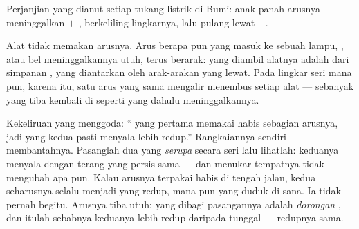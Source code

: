 \begin{omfigure}

{\small Perjanjian yang dianut setiap tukang listrik di Bumi: anak
panah arusnya meninggalkan $+$ , berkeliling lingkarnya,
lalu pulang lewat $-$.}
\end{omfigure}

\begin{proposition}\label{prop:g7:circuits-series-parallel:notconsumed}
Alat tidak memakan arusnya. Arus berapa pun yang masuk ke sebuah
lampu, , atau bel meninggalkannya utuh, terus berarak: yang
diambil alatnya adalah \emph{} dari simpanan , yang
diantarkan oleh arak-arakan yang lewat. Pada lingkar seri mana pun,
karena itu, satu arus yang sama mengalir menembus setiap alat ---
sebanyak yang tiba kembali di  seperti yang dahulu
meninggalkannya.
\end{proposition}

\begin{example}\label{ex:g7:circuits-series-parallel:trial}
Kekeliruan yang menggoda: `` yang pertama memakai habis sebagian
arusnya, jadi yang kedua pasti menyala lebih redup.'' Rangkaiannya
sendiri membantahnya. Pasanglah dua  yang \emph{serupa} secara
seri lalu lihatlah: keduanya menyala dengan terang yang persis sama
--- dan menukar tempatnya tidak mengubah apa pun. Kalau arusnya
terpakai habis di tengah jalan,  kedua seharusnya selalu menjadi
yang redup,  mana pun yang duduk di sana. Ia tidak pernah
begitu. Arusnya tiba utuh; yang dibagi pasangannya adalah
\emph{dorongan} , dan itulah sebabnya keduanya lebih redup
daripada  tunggal --- redupnya sama.
\end{example}

